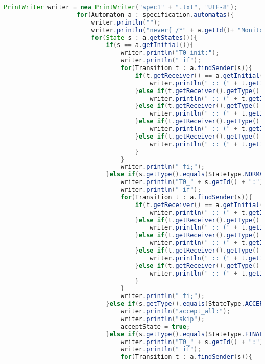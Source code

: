 \begin{lstlisting}[language=java, caption={példa unit teszteset.},captionpos=b]
					PrintWriter writer = new PrintWriter("spec1" + ".txt", "UTF-8");
					for(Automaton a : specification.automatas){
						writer.println("");
						writer.println("never{ /*" + a.getId()+ "Monitor" + "*/");
						for(State s : a.getStates()){
							if(s == a.getInitial()){
								writer.println("T0_init:");
								writer.println(" if");
								for(Transition t : a.findSender(s)){
									if(t.getReceiver() == a.getInitial()){
										writer.println(" :: (" + t.getId() + ") " + "->" + " goto T0_init");
									}else if(t.getReceiver().getType().equals(StateType.NORMAL)){
										writer.println(" :: (" + t.getId() + ") " + "->" + " goto T0_" + t.getReceiver().getId());
									}else if(t.getReceiver().getType().equals(StateType.ACCEPT_ALL)){
										writer.println(" :: (" + t.getId() + ") " + "->" + " goto accept_all" );
									}else if(t.getReceiver().getType().equals(StateType.FINAL)){
										writer.println(" :: (" + t.getId() + ") " + "->" + " goto T0_" + t.getReceiver().getId());
									}else if(t.getReceiver().getType().equals(StateType.ACCEPT)){
										writer.println(" :: (" + t.getId() + ") " + "->" + " goto accept_" + t.getReceiver().getId());
									}
								}
								writer.println(" fi;");
							}else if(s.getType().equals(StateType.NORMAL)){
								writer.println("T0_" + s.getId() + ":");
								writer.println(" if");
								for(Transition t : a.findSender(s)){
									if(t.getReceiver() == a.getInitial()){
										writer.println(" :: (" + t.getId() + ") " + "->" + " goto T0_init");
									}else if(t.getReceiver().getType().equals(StateType.NORMAL)){
										writer.println(" :: (" + t.getId() + ") " + "->" + " goto T0_" + t.getReceiver().getId());
									}else if(t.getReceiver().getType().equals(StateType.ACCEPT_ALL)){
										writer.println(" :: (" + t.getId() + ") " + "->" + " goto accept_all" );
									}else if(t.getReceiver().getType().equals(StateType.FINAL)){
										writer.println(" :: (" + t.getId() + ") " + "->" + " goto T0_" + t.getReceiver().getId());
									}else if(t.getReceiver().getType().equals(StateType.ACCEPT)){
										writer.println(" :: (" + t.getId() + ") " + "->" + " goto accept_" + t.getReceiver().getId());
									}
								}
								writer.println(" fi;");
							}else if(s.getType().equals(StateType.ACCEPT_ALL) && !acceptState){
								writer.println("accept_all:");
								writer.println("skip");
								acceptState = true;
							}else if(s.getType().equals(StateType.FINAL)){
								writer.println("T0_" + s.getId() + ":");
								writer.println(" if");
								for(Transition t : a.findSender(s)){

\end{lstlisting}
